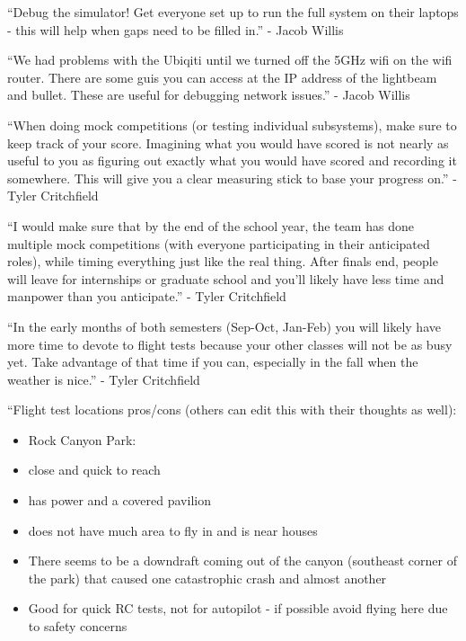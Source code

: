 {``Debug the simulator! Get everyone set up to run the full system on
their laptops - this will help when gaps need to be filled in.'' - Jacob
Willis}

{}

{``We had problems with the Ubiqiti until we turned off the 5GHz wifi on
the wifi router. There are some guis you can access at the IP address of
the lightbeam and bullet. These are useful for debugging network
issues.'' - Jacob Willis}

{}

{``When doing mock competitions (or testing individual subsystems), make
sure to keep track of your score. Imagining what you would have scored
is not nearly as useful to you as figuring out exactly what you would
have scored and recording it somewhere. This will give you a clear
measuring stick to base your progress on.'' - Tyler Critchfield}

{}

{``I would make sure that by the end of the school year, the team has
done multiple mock competitions (with everyone participating in their
anticipated roles), while timing everything just like the real thing.
After finals end, people will leave for internships or graduate school
and you'll likely have less time and manpower than you anticipate.'' -
Tyler Critchfield}

{}

{``In the early months of both semesters (Sep-Oct, Jan-Feb) you will
likely have more time to devote to flight tests because your other
classes will not be as busy yet. Take advantage of that time if you can,
especially in the fall when the weather is nice.'' - Tyler Critchfield}

{}

{}

{}

{``Flight test locations pros/cons (others can edit this with their
thoughts as well):}

\begin{itemize}
\tightlist
\item
  {Rock Canyon Park: }
\end{itemize}

\begin{itemize}
\tightlist
\item
  {close and quick to reach}
\item
  {has power and a covered pavilion}
\item
  {does not have much area to fly in and is near houses}
\item
  {There seems to be a downdraft coming out of the canyon (southeast
  corner of the park) that caused one catastrophic crash and almost
  another}
\item
  {Good for quick RC tests, not for autopilot - if possible avoid flying
  here due to safety concerns}
\end{itemize}

